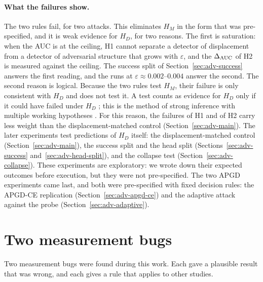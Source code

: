 \documentclass[../ppgc-tese.tex]{subfiles}
\begin{document}
\paragraph*{What the failures show.}
The two rules fail, for two attacks. This eliminates $H_{M}$ in the form that
was pre-specified, and it is weak evidence for $H_{D}$, for two reasons. The
first is saturation: when the AUC is at the ceiling, H1 cannot separate a
detector of displacement from a detector of adversarial structure that grows
with $\varepsilon$, and the $\Delta_{\mathrm{AUC}}$ of H2 is measured against the ceiling. The
success split of Section~\ref{sec:adv-success} answers the first reading, and
the runs at $\varepsilon\approx0.002$--$0.004$ answer the second. The second
reason is logical. Because the two rules test $H_{M}$, their failure is only
consistent with $H_{D}$ and does not test it. A test counts as evidence for $H_{D}$ only if it
could have failed under $H_{D}$ \cite{mayo2018severe_testing}; this is the
method of strong inference with multiple working hypotheses
\cite{platt1964strong_inference,chamberlin1890multiple_working_hypotheses}.
For this reason, the failures of H1 and of H2 carry less weight than the
displacement-matched control (Section~\ref{sec:adv-main}). The later
experiments test predictions of $H_{D}$ itself: the displacement-matched
control (Section~\ref{sec:adv-main}), the success split and the head split
(Sections~\ref{sec:adv-success} and~\ref{sec:adv-head-split}), and the
collapse test (Section~\ref{sec:adv-collapse}). These experiments are
exploratory: we wrote down their expected outcomes before execution, but they
were not pre-specified.
The two APGD experiments came last, and both were pre-specified with fixed
decision rules: the APGD-CE replication (Section~\ref{sec:adv-apgd-ce}) and
the adaptive attack against the probe (Section~\ref{sec:adv-adaptive}).

\section{Two measurement bugs}
\label{sec:adv-bugs}

Two measurement bugs were found during this work. Each gave a plausible result
that was wrong, and each gives a rule that applies to other studies.
\end{document}
